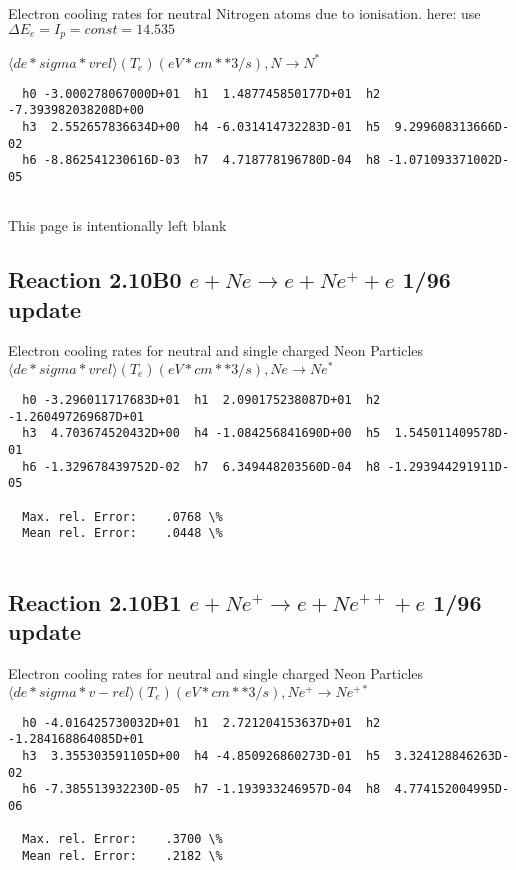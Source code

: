 \documentclass[12pt,dvipdfmx]{article}
\begin{document}
 Electron cooling rates for neutral Nitrogen atoms due to ionisation.
 here: use $\Delta E_e = I_p = const = 14.535$



 $ \langle de*sigma*vrel \rangle(T_e)  (eV*cm**3/s), N \rightarrow N^{*} $


\begin{small}\begin{verbatim}
  h0 -3.000278067000D+01  h1  1.487745850177D+01  h2 -7.393982038208D+00
  h3  2.552657836634D+00  h4 -6.031414732283D-01  h5  9.299608313666D-02
  h6 -8.862541230616D-03  h7  4.718778196780D-04  h8 -1.071093371002D-05


\end{verbatim}\end{small}

\newpage
This page is intentionally left blank
\newpage


\subsection{
Reaction 2.10B0 $e + Ne \rightarrow e + Ne^+ + e  $ 1/96 update
}

  Electron cooling rates for neutral and single
  charged Neon Particles
 $ \langle de*sigma*vrel \rangle(T_e)  (eV*cm**3/s), Ne  \rightarrow  Ne^*$

\begin{small}\begin{verbatim}
  h0 -3.296011717683D+01  h1  2.090175238087D+01  h2 -1.260497269687D+01
  h3  4.703674520432D+00  h4 -1.084256841690D+00  h5  1.545011409578D-01
  h6 -1.329678439752D-02  h7  6.349448203560D-04  h8 -1.293944291911D-05

  Max. rel. Error:    .0768 \%
  Mean rel. Error:    .0448 \%


\end{verbatim}\end{small}


\subsection{
Reaction 2.10B1 $ e + Ne^+ \rightarrow e + Ne^{++} + e $ 1/96 update
}

  Electron cooling rates for neutral and single
  charged Neon Particles
 $  \langle de*sigma*v-rel \rangle(T_e)  (eV*cm**3/s), Ne^+ \rightarrow Ne^{+*} $

\begin{small}\begin{verbatim}
  h0 -4.016425730032D+01  h1  2.721204153637D+01  h2 -1.284168864085D+01
  h3  3.355303591105D+00  h4 -4.850926860273D-01  h5  3.324128846263D-02
  h6 -7.385513932230D-05  h7 -1.193933246957D-04  h8  4.774152004995D-06

  Max. rel. Error:    .3700 \%
  Mean rel. Error:    .2182 \%

\end{verbatim}\end{small}
\end{document}
